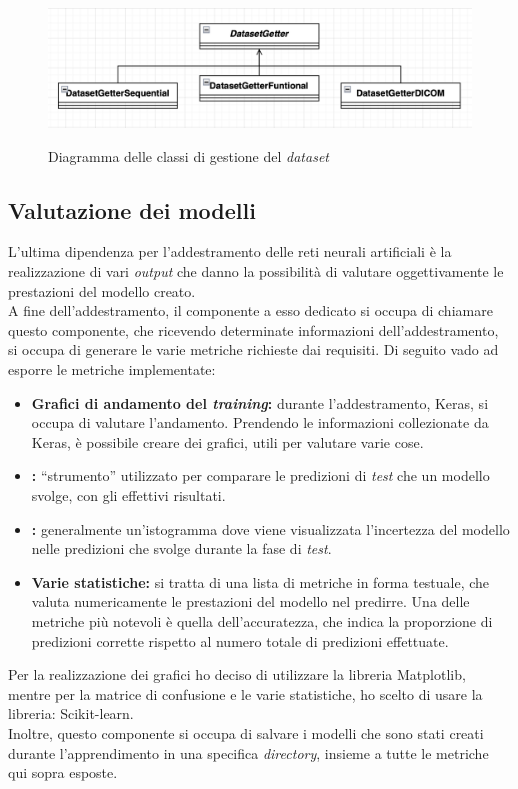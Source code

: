 \begin{figure}[H]
    \centering
    \includegraphics[alt={Diagramma delle classi di gestione del \textit{dataset}}, width=0.9\columnwidth]{img/dg-diag.png}
    \caption{\centering Diagramma delle classi di gestione del \textit{dataset}}
    \label{fig:datasetgetter-diagram}
\end{figure}

\subsection{Valutazione dei modelli}\noindent
L'ultima dipendenza per l'addestramento delle reti neurali artificiali è la realizzazione di vari \textit{output} che danno la possibilità di valutare oggettivamente le prestazioni del modello creato.\\
A fine dell'addestramento, il componente a esso dedicato si occupa di chiamare questo componente, che ricevendo determinate informazioni dell'addestramento, si occupa di generare le varie metriche richieste dai requisiti.
\newpage\noindent
Di seguito vado ad esporre le metriche implementate:
\begin{itemize}
    \item \textbf{Grafici di andamento del \textit{training}:} durante l'addestramento, Keras, si occupa di valutare l'andamento. Prendendo le informazioni collezionate da Keras, è possibile creare dei grafici, utili per valutare varie cose.
    \item \textbf{:} ``strumento'' utilizzato per comparare le predizioni di \textit{test} che un modello svolge, con gli effettivi risultati.
    \item \textbf{:} generalmente un'istogramma dove viene visualizzata l'incertezza del modello nelle predizioni che svolge durante la fase di \textit{test}.
    \item \textbf{Varie statistiche:} si tratta di una lista di metriche in forma testuale, che valuta numericamente le prestazioni del modello nel predirre. Una delle metriche più notevoli è quella dell'accuratezza, che indica la proporzione di predizioni corrette rispetto al numero totale di predizioni effettuate.
\end{itemize}
Per la realizzazione dei grafici ho deciso di utilizzare la libreria Matplotlib, mentre per la matrice di confusione e le varie statistiche, ho scelto di usare la libreria: Scikit-learn.\\
Inoltre, questo componente si occupa di salvare i modelli che sono stati creati durante l'apprendimento in una specifica \textit{directory}, insieme a tutte le metriche qui sopra esposte.


